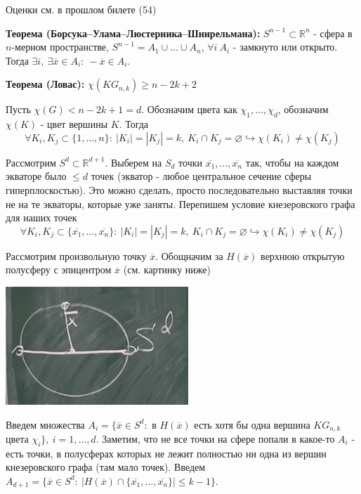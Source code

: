 \par \Note Оценки см. в прошлом билете (54)

\par \textbf{Теорема (Борсука–Улама–Люстерника–Шнирельмана):} $S^{n-1} \subset \mathbb{R}^n$ - сфера в $n$-мерном пространстве, $S^{n-1}=A_1 \cup \ldots \cup A_n$, $\forall i \: A_i$ - замкнуто или открыто. Тогда $\exists i, \: \exists \overline{x} \in A_i: \: -\overline{x} \in A_i$.

\par \textbf{Теорема (Ловас):} $\chi(KG_{n,k})\geq n-2k+2$
\par \Proof Пусть $\chi(G) < n-2k+1=d$. Обозначим цвета как $\chi_1, \ldots, \chi_d$, обозначим $\chi(K)$ - цвет вершины $K$. Тогда $$\forall K_i, K_j \subset \{1, \ldots, n\}: \: |K_i|=|K_j|=k, \: K_i \cap K_j=\varnothing \hookrightarrow \chi(K_i) \neq \chi(K_j)$$

\par Рассмотрим $S^d \subset \mathbb{R}^{d+1}$. Выберем на $S_d$ точки $\overline{x_1}, \ldots, \overline{x_n}$ так, чтобы на каждом экваторе было $\leq d$ точек (экватор - любое центральное сечение сферы гиперплоскостью). Это можно сделать, просто последовательно выставляя точки не на те экваторы, которые уже заняты. Перепишем условие кнезеровского графа для наших точек $$\forall K_i, K_j \subset \{\overline{x_1}, \ldots, \overline{x_n}\}: \: |K_i|=|K_j|=k, \: K_i \cap K_j=\varnothing \hookrightarrow \chi(K_i) \neq \chi(K_j)$$

\par Рассмотрим произвольную точку $\overline{x}$. Обощначим за $H(\overline{x})$ верхнюю открытую полусферу с эпицентром $\overline{x}$ (см. картинку ниже)
\\
\begin{center}
    \includegraphics[scale=0.8]{images/dima_hemisphere.png}
\end{center}
\par Введем множества $A_i=\{\overline{x} \in S^d:$ в $H(\overline{x})$ есть хотя бы одна вершина $KG_{n,k}$ цвета $\chi_i\}, \: i=1,\ldots, d$. Заметим, что не все точки на сфере попали в какое-то $A_i$ - есть точки, в полусферах которых не лежит полностью ни одна из вершин кнезеровского графа (там мало точек). Введем $A_{d+1}=\{\overline{x}\in S^d: \: |H(\overline{x})\cap\{\overline{x_1}, \ldots, \overline{x_n}\}|\leq k-1\}$.

